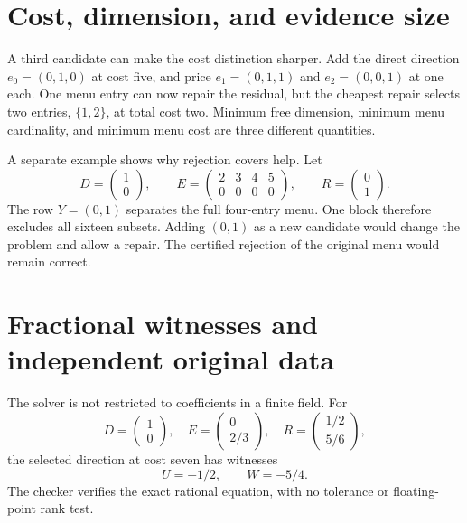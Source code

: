 \section{Cost, dimension, and evidence size}

A third candidate can make the cost distinction sharper. Add the direct direction $e_0=(0,1,0)$ at cost five, and price $e_1=(0,1,1)$ and $e_2=(0,0,1)$ at one each. One menu entry can now repair the residual, but the cheapest repair selects two entries, $\{1,2\}$, at total cost two. Minimum free dimension, minimum menu cardinality, and minimum menu cost are three different quantities.

A separate example shows why rejection covers help. Let
\[
 D=\begin{pmatrix}1\\0\end{pmatrix},\qquad
 E=\begin{pmatrix}2&3&4&5\\0&0&0&0\end{pmatrix},\qquad
 R=\begin{pmatrix}0\\1\end{pmatrix}.
\]
The row $Y=(0,1)$ separates the full four-entry menu. One block therefore excludes all sixteen subsets. Adding $(0,1)$ as a new candidate would change the problem and allow a repair. The certified rejection of the original menu would remain correct.


\section{Fractional witnesses and independent original data}

The solver is not restricted to coefficients in a finite field. For
\[
 D=\begin{pmatrix}1\\0\end{pmatrix},\quad
 E=\begin{pmatrix}0\\2/3\end{pmatrix},\quad
 R=\begin{pmatrix}1/2\\5/6\end{pmatrix},
\]
the selected direction at cost seven has witnesses
\[
 U=-1/2,\qquad W=-5/4.
\]
The checker verifies the exact rational equation, with no tolerance or floating-point rank test.

